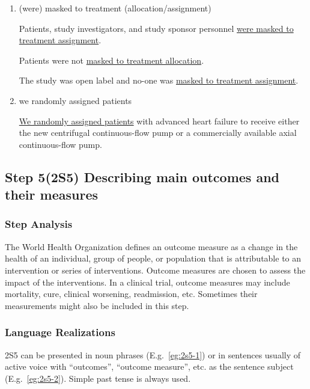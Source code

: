 \documentclass{ctexbook}
\begin{document}
\begin{enumerate}
      \item (were) masked to treatment (allocation/assignment)
      \begin{eg}{}
        Patients, study investigators, and study sponsor personnel \uline{were masked to treatment assignment}.
      \end{eg}
      \begin{eg}{}
        Patients were not \uline{masked to treatment allocation}.
      \end{eg}
      \begin{eg}{}
        The study was open label and no-one was \uline{masked to treatment assignment}.
      \end{eg}

      \item we randomly assigned patients
      \begin{eg}{}
        \uline{We randomly assigned patients} with advanced heart failure to receive either the new centrifugal continuous-flow pump or a commercially available axial continuous-flow pump.
      \end{eg}
    \end{enumerate}

  \subsection{Step 5(2S5) Describing main outcomes and their measures}

    \subsubsection{Step Analysis}

    The World Health Organization defines an outcome measure as a change in the health of an individual, group of people, or population that is attributable to an intervention or series of interventions. Outcome measures are chosen to assess the impact of the interventions. In a clinical trial, outcome measures may include mortality, cure, clinical worsening, readmission, etc. Sometimes their measurements might also be included in this step.

    \subsubsection{Language Realizations}

    2S5 can be presented in noun phrases (E.g.~\ref{eg:2s5-1}) or in sentences usually of active voice with ``outcomes'', ``outcome measure'', etc. as the sentence subject (E.g.~\ref{eg:2s5-2}). Simple past tense is always used.
\end{document}
